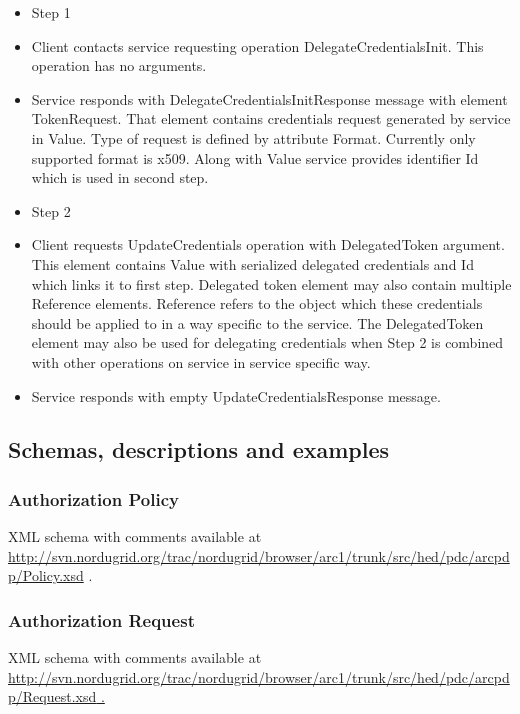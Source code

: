\documentclass{article}
\newcommand\textstyleInternetlink[1]{\textcolor[rgb]{0.0,0.0,0.5019608}{#1}}
\newcommand\liststyleWWviiiNumix{%
\renewcommand\labelitemi{[F0B7?]}
\renewcommand\labelitemii{{}-}
\renewcommand\labelitemiii{${\blacksquare}$}
\renewcommand\labelitemiv{[F06C?]}
}
\newcommand\liststyleWWviiiNumx{%
\renewcommand\labelitemi{[F0B7?]}
\renewcommand\labelitemii{[F081?]}
\renewcommand\labelitemiii{${\blacksquare}$}
\renewcommand\labelitemiv{[F06C?]}
}
\begin{document}
\liststyleWWviiiNumix
\begin{itemize}
\item {\color{black}
Step 1}
\item {\color{black}
Client contacts service requesting operation DelegateCredentialsInit.
This operation has no arguments.}
\item {\color{black}
Service responds with DelegateCredentialsInitResponse message with
element TokenRequest. That element contains credentials request
generated by service in Value. Type of request is defined by attribute
Format. Currently only supported format is x509. Along with Value
service provides identifier Id which is used in second step.}
\end{itemize}
\liststyleWWviiiNumx
\begin{itemize}
\item {\color{black}
Step 2}
\item {\color{black}
Client requests UpdateCredentials operation with DelegatedToken
argument. This element contains Value with serialized delegated
credentials and Id which links it to first step. Delegated token
element may also contain multiple Reference elements. Reference refers
to the object which these credentials should be applied to in a way
specific to the service. The DelegatedToken element may also be used
for delegating credentials when Step 2 is combined with other
operations on service in service specific way.}
\item {\color{black}
Service responds with empty UpdateCredentialsResponse message.}
\end{itemize}
\subsection[Schemas, descriptions and examples]{Schemas, descriptions
and examples}
\subsubsection[Authorization Policy]{Authorization Policy}
\label{bkm:Ref204009564}{\upshape\color{black}
XML schema with comments available at
\url{http://svn.nordugrid.org/trac/nordugrid/browser/arc1/trunk/src/hed/pdc/arcpdp/Policy.xsd}
.}

\subsubsection[Authorization Request]{Authorization Request}
\label{bkm:Ref204009595}{\upshape\color{black}
XML schema with comments available at
\url{http://svn.nordugrid.org/trac/nordugrid/browser/arc1/trunk/src/hed/pdc/arcpdp/Request.xsd}\href{http://svn.nordugrid.org/trac/nordugrid/browser/arc1/trunk/src/hed/pdc/arcpdp/Policy.xsd}{\textstyleInternetlink{
.}}}
\end{document}
